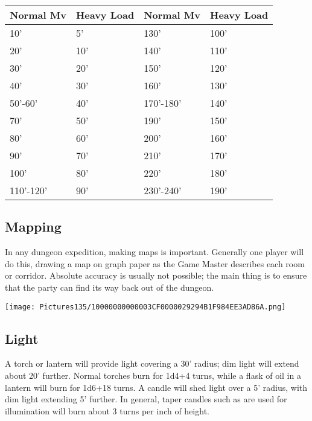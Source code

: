 \documentclass[a4paper,twoside,openany,10pt]{book}
\begin{document}
\begin{multicols}{2}
\begin{flushleft}
	\begin{tabularx}{0.47\textwidth}{@{}ll|ll@{}}
\textbf{Normal Mv}&\textbf{Heavy Load}&\textbf{Normal Mv}&\textbf{Heavy Load}\\\toprule
10' & 5' &  130' &100' \\\hline
20' & 10' &  140' &110' \\\hline
30' & 20' &  150' &120' \\\hline
40' & 30' &  160' &130' \\\hline
50'-60' & 40' &170'-180' & 140' \\\hline
70' & 50' &  190' &150' \\\hline
80' & 60' &  200' &160' \\\hline
90' & 70' &  210' &170' \\\hline
100' & 80' &  220' &180' \\\hline
110'-120' & 90'  &230'-240' & 190' \\\bottomrule
\end{tabularx}
\end{flushleft}

\subsection{Mapping}\label{mapping}

In any dungeon expedition, making maps is important. Generally one player will do this, drawing a map on graph paper as the Game Master describes each room or corridor. Absolute accuracy is usually not possible; the main thing is to ensure that the party can find its way back out of the dungeon.

\begin{flushleft}
	\texttt{[image: Pictures135/10000000000003CF0000029294B1F984EE3AD86A.png]}
\end{flushleft}

\subsection{Light}\label{light}

A torch or lantern will provide light covering a 30' radius; dim light will extend about 20' further. Normal torches burn for 1d4+4 turns, while a flask of oil in a lantern will burn for 1d6+18 turns. A candle will shed light over a 5' radius, with dim light extending 5' further. In general, taper candles such as are used for illumination will burn about 3 turns per inch of height.


\end{multicols}
\end{document}
